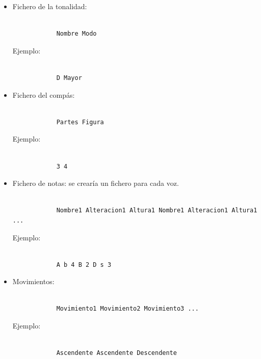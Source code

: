\begin{itemize}

	\item Fichero de la tonalidad:

		\begin{lstlisting}[frame=single]

			Nombre Modo

		\end{lstlisting}

		Ejemplo:

		\begin{lstlisting}[frame=single]

			D Mayor

		\end{lstlisting} 

	\bigskip
	\item Fichero del compás:

		\begin{lstlisting}[frame=single]

			Partes Figura

		\end{lstlisting}

		Ejemplo:

		\begin{lstlisting}[frame=single]

			3 4

		\end{lstlisting} 

	\bigskip
	\item Fichero de notas: se crearía un fichero para cada voz.
	
		\begin{lstlisting}[frame=single]

			Nombre1 Alteracion1 Altura1 Nombre1 Alteracion1 Altura1 ...

		\end{lstlisting} 

		Ejemplo:

		\begin{lstlisting}[frame=single]

			A b 4 B 2 D s 3

		\end{lstlisting} 

	\bigskip
	\item Movimientos:

		\begin{lstlisting}[frame=single]

			Movimiento1 Movimiento2 Movimiento3 ...

		\end{lstlisting} 

		Ejemplo:

		\begin{lstlisting}[frame=single]

			Ascendente Ascendente Descendente

		\end{lstlisting} 

\end{itemize}

